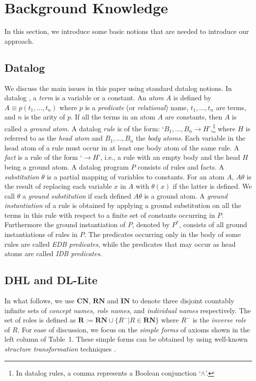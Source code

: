 \section{Background Knowledge}
\label{sec:background}

In this section, we introduce some basic notions that are needed to introduce our approach.


\subsection{Datalog}

We discuss the main issues in this paper using standard datalog notions.
In datalog \cite{database}, a \emph{term} is a variable or a constant. An \emph{atom} $A$
is defined by $A\equiv p(t_1,...,t_n)$ where $p$ is a \emph{predicate} (or \emph{relational})
name, $t_1,...,t_n$ are terms, and $n$ is the arity of $p$. If all the terms in an atom $A$ are
constants, then $A$ is called a \emph{ground atom}.
A datalog \emph{rule} is of the form: `$B_1,...,B_n\rightarrow H$',\footnote{In datalog rules, a comma
represents a Boolean conjunction `$\wedge$'.} where $H$ is referred to as
the \emph{head atom} and $B_1,...,B_n$ the \emph{body atoms}. Each variable in the head atom
of a rule must occur in at least one body atom of the same rule. A \emph{fact} is a rule of
the form `$\rightarrow H$', i.e., a rule with an empty body and the head $H$ being a ground atom.
A datalog program $P$ consists of rules and facts.
A \emph{substitution} $\theta$ is a partial mapping of variables to constants.
For an atom $A$, $A\theta$ is the result of replacing each variable $x$ in $A$
with $\theta(x)$ if the latter is defined. We call $\theta$ a \emph{ground substitution}
if each defined $A\theta$ is a ground atom.
A \emph{ground instantiation} of a rule is obtained by applying a ground substitution on all
the terms in this rule with respect to a finite set of constants occurring in $P$.
Furthermore the ground instantiation of $P$, denoted by $P^*$,
consists of all ground instantiations of rules in $P$.
The predicates occurring only in the body  of some rules are called \emph{EDB predicates},
while the predicates that may occur as head atoms are called \emph{IDB predicates}.


\subsection{DHL and DL-Lite}

In what follows, we use $\textbf{CN}$, $\textbf{RN}$ and $\textbf{IN}$
to denote three disjoint countably
infinite sets of \emph{concept names, role names}, and \emph{individual names} respectively.
The set of roles is defined as $\textbf{R}:=\textbf{RN}\cup\{R^-|R\in\textbf{RN}\}$
where $R^-$ is the \emph{inverse role} of $R$.
For ease of discussion, we focus on the \emph{simple forms} of axioms shown
in the left column of Table~1. These simple forms can be obtained by using
well-known \emph{structure transformation} techniques \cite{KrotzschRH07,Kazakov09}.


